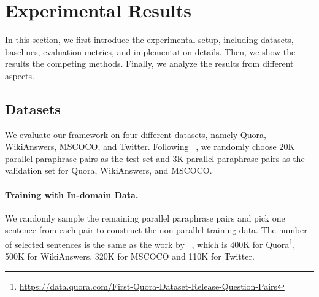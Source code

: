 \section{Experimental Results}

In this section, we first introduce the experimental setup, including 
datasets, baselines, evaluation metrics, and implementation details. 
Then, we show the results the competing methods.
Finally, we analyze the results from different aspects.

\subsection{Datasets}
We evaluate our framework on four different datasets, namely Quora, WikiAnswers, MSCOCO, and Twitter. Following \citeauthor{liu2019unsupervised}~, we randomly choose 20K parallel paraphrase pairs as the test set and 3K parallel paraphrase pairs as the validation set for Quora, WikiAnswers, and MSCOCO. 

\paragraph{Training with In-domain Data. }
We randomly sample the remaining parallel paraphrase pairs and 
pick one sentence from each pair to construct the non-parallel training data.
The number of selected sentences is the same as the work by 
\citeauthor{liu2019unsupervised}~, which is 400K 
for Quora\footnote{ \url{https://data.quora.com/First-Quora-Dataset-Release-Question-Pairs}}, 500K for WikiAnswers, 320K for MSCOCO and 110K for Twitter.



